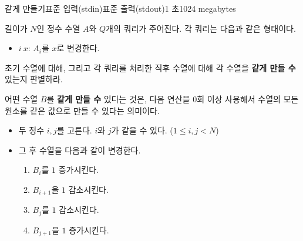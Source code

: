 \def\probtitle{같게 만들기}
\def\probno{H} %

\begin{problem}{\probtitle}{표준 입력(stdin)}{표준 출력(stdout)}{1 초}{1024 megabytes}

길이가 \(N\)인 정수 수열 \(A\)와 \(Q\)개의 쿼리가 주어진다. 각 쿼리는 다음과 같은 형태이다.

\begin{itemize}
    \item \(i~x\): \(A_i\)를 \(x\)로 변경한다.
\end{itemize}


초기 수열에 대해, 그리고 각 쿼리를 처리한 직후 수열에 대해 각 수열을 \textbf{같게 만들 수} 있는지 판별하라.

어떤 수열 $B$를 \textbf{같게 만들 수} 있다는 것은, 다음 연산을 0회 이상 사용해서 수열의 모든 원소를 같은 값으로 만들 수 있다는 의미이다.

\begin{itemize}[topsep=0pt,noitemsep]
    \item 두 정수 $i, j$를 고른다. $i$와 $j$가 같을 수 있다. ($1 \le i, j < N$)
    \item 그 후 수열을 다음과 같이 변경한다.
    \begin{enumerate}[topsep=0pt,noitemsep] 
        \item $B_i$를 $1$ 증가시킨다.
        \item $B_{i+1}$을 $1$ 감소시킨다.
        \item $B_j$를 $1$ 감소시킨다.
        \item $B_{j+1}$을 $1$ 증가시킨다.
    \end{enumerate}
\end{itemize}





\end{problem}
